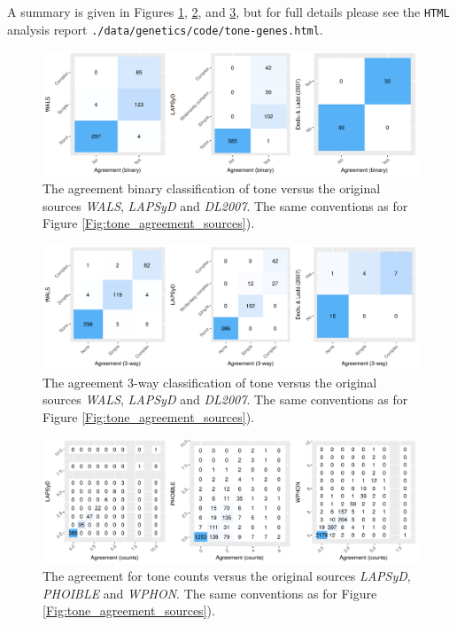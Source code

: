 \documentclass[twoside,onecolumn]{article}
\begin{document}
A summary is given in Figures \ref{Fig:tone_agreement_with_sources_binary},  \ref{Fig:tone_agreement_with_sources_3way}, and  \ref{Fig:tone_agreement_with_sources_counts}, but for full details please see the \texttt{HTML} analysis report \verb|./data/genetics/code/tone-genes.html|.

\begin{figure}[h]
  \centering
  \includegraphics[width=\textwidth]{../../code/figures/tone_agreement_with_sources_binary}
  \caption{The agreement binary classification of tone versus the original sources \textit{WALS}, \textit{LAPSyD} and \textit{DL2007}. The same conventions as for Figure \ref{Fig:tone_agreement_sources}).}
  \label{Fig:tone_agreement_with_sources_binary}
\end{figure}

\begin{figure}[h]
  \centering
  \includegraphics[width=\textwidth]{../../code/figures/tone_agreement_with_sources_3way}
  \caption{The agreement 3-way classification of tone versus the original sources \textit{WALS}, \textit{LAPSyD} and \textit{DL2007}. The same conventions as for Figure \ref{Fig:tone_agreement_sources}).}
  \label{Fig:tone_agreement_with_sources_3way}
\end{figure}

\begin{figure}[h]
  \centering
  \includegraphics[width=\textwidth]{../../code/figures/tone_agreement_with_sources_counts}
  \caption{The agreement for tone counts versus the original sources \textit{LAPSyD}, \textit{PHOIBLE} and \textit{WPHON}. The same conventions as for Figure \ref{Fig:tone_agreement_sources}).}
  \label{Fig:tone_agreement_with_sources_counts}
\end{figure}
\end{document}
